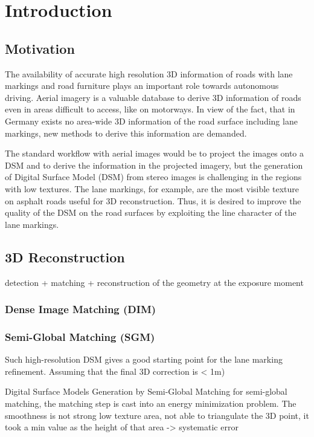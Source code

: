 
\chapter{Introduction}

\section{Motivation}
The availability of accurate high resolution 3D information of roads with lane markings and road furniture plays an important role towards autonomous driving. Aerial imagery is a valuable database to derive 3D information of roads even in areas difficult to access, like on motorways. In view of the fact, that in Germany exists no area-wide 3D information of the road surface including lane markings, new methods to derive this information are demanded.

The standard workflow with aerial images would be to project the images onto a DSM and to derive the information in the projected imagery, but the generation of Digital Surface Model (DSM) from stereo images is challenging in the regions with low textures. The lane markings, for example, are the most visible texture on asphalt roads useful for 3D reconstruction. Thus, it is desired to improve the quality of the DSM on the road surfaces by exploiting the line character of the lane markings. 

\section{3D Reconstruction}
detection + matching + reconstruction of the geometry at the exposure moment

\subsection{Dense Image Matching (DIM)}




\subsection{Semi-Global Matching (SGM)}

Such high-resolution DSM gives a good starting point for the lane marking refinement. Assuming that the final 3D correction is < 1m)


Digital Surface Models Generation by Semi-Global Matching
for semi-global matching, the matching step is cast into an energy minimization problem.
The smoothness is not strong
low texture area, not able to triangulate the 3D point, it took a min value as the height of that area -> systematic error



